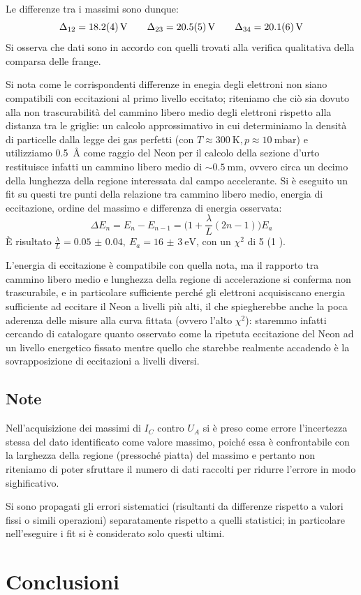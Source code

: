 	Le differenze tra i massimi sono dunque:
	$$\Delta_{12}=\SI{18.2\pm 0.4}{\volt} \qquad \Delta_{23}=\SI{20.5 \pm 0.5}{\volt} \qquad \Delta_{34}=\SI{20.1 \pm 0.6}{\volt}$$
	Si osserva che dati sono in accordo con quelli trovati alla
	verifica qualitativa della comparsa delle frange.

	Si nota come le corrispondenti differenze in enegia degli elettroni non siano
	compatibili con eccitazioni al primo livello eccitato;
	riteniamo che ciò sia dovuto alla non trascurabilità del cammino libero medio
	degli elettroni rispetto alla distanza tra le griglie: un calcolo approssimativo
	in cui determiniamo la densità di particelle dalla legge dei gas perfetti
	(con $T \approx \SI{300}{\K}, p \approx \SI{10}{\milli\bar}$) e utilizziamo
	\SI{0.5}{\angstrom} come raggio del Neon per il calcolo della sezione d'urto
	restituisce infatti un cammino libero medio di $\sim \SI{0.5}{\mm}$,
	ovvero circa un decimo della lunghezza della regione interessata dal campo accelerante.
	Si è eseguito un fit su questi tre punti della relazione tra cammino libero medio,
	energia di eccitazione, ordine del massimo e differenza di energia osservata:
	$$ \Delta E_n = E_n - E_{n-1} = \big(1 + \frac{\lambda}{L}(2n - 1)\big) E_a $$
	È risultato $\frac{\lambda}{L} = \SI{0.05(4)}, \ E_a = \SI{16(3)}{\eV}$, con un $\chi^2$ di 5 (1 \dof).

	L'energia di eccitazione è compatibile con quella nota, ma
	il rapporto tra cammino libero medio e lunghezza della regione di accelerazione
	si conferma non trascurabile, e in particolare sufficiente perché gli elettroni acquisiscano
	energia sufficiente ad eccitare il Neon a livelli più alti, il che
	spiegherebbe anche la poca aderenza delle misure alla curva fittata (ovvero
	l'alto $\chi^2$): staremmo infatti cercando di catalogare quanto osservato
	come la ripetuta eccitazione del Neon ad un livello energetico fissato
	mentre quello che starebbe realmente accadendo è la sovrapposizione di
	eccitazioni a livelli diversi.

\subsection{Note}
Nell'acquisizione dei massimi di $I_C$ contro $U_A$ si è preso come errore
l'incertezza stessa del dato identificato come valore massimo, poiché essa è confrontabile con
la larghezza della regione (pressoché piatta) del massimo e pertanto non riteniamo
di poter sfruttare il numero di dati raccolti per ridurre l'errore in modo sighificativo.

Si sono propagati gli errori sistematici (risultanti da differenze rispetto a valori fissi
o simili operazioni) separatamente rispetto a quelli statistici; in particolare
nell'eseguire i fit si è considerato solo questi ultimi.

\section{Conclusioni}
